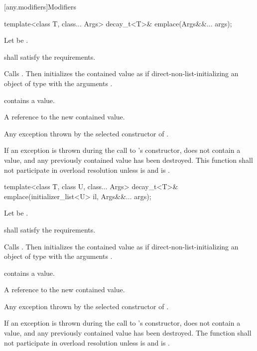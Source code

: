 [any.modifiers]{Modifiers}

%
\begin{itemdecl}
template<class T, class... Args>
  decay_t<T>& emplace(Args&&... args);
\end{itemdecl}

\begin{itemdescr}
\pnum
Let  be .

\pnum
\requires
{} shall satisfy the  requirements.

\pnum
\effects Calls .
Then initializes the contained value as if direct-non-list-initializing
an object of type  with the arguments .

\pnum
\postconditions {} contains a value.

\pnum
\returns
A reference to the new contained value.

\pnum
\throws Any exception thrown by the selected constructor of .

\pnum
\remarks If an exception is thrown during the call to 's constructor,
 does not contain a value, and any previously contained value
has been destroyed.
This function shall not participate in overload resolution unless
 is  and
 is .
\end{itemdescr}

%
\begin{itemdecl}
template<class T, class U, class... Args>
  decay_t<T>& emplace(initializer_list<U> il, Args&&... args);
\end{itemdecl}

\begin{itemdescr}
\pnum
Let  be .

\pnum
\requires
{} shall satisfy the  requirements.

\pnum
\effects Calls . Then initializes the contained value
as if direct-non-list-initializing an object of type  with the arguments
.

\pnum
\postconditions {} contains a value.

\pnum
\returns
A reference to the new contained value.

\pnum
\throws Any exception thrown by the selected constructor of .

\pnum
\remarks If an exception is thrown during the call to 's constructor,
 does not contain a value, and any previously contained value
has been destroyed.
The function shall not participate in overload resolution unless
 is  and
 is .
\end{itemdescr}

